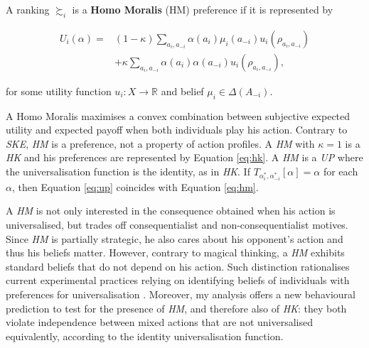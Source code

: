 \begin{definition}
	A ranking \( \succsim_i \) is a \textbf{Homo Moralis} (HM) preference if it is represented by

	\begin{equation}\label{eq:hm}
		\begin{aligned}
			U_i ( \alpha ) = {} & (1-\kappa )\sum_{a_i, a_{-i}} \alpha (a_i) \mu_{i}(a_{-i}) u_i(\rho_{a_i, a_{-i}}) \\[1mm]
			{}                  & + \kappa \sum_{a_i, a_{-i}} \alpha (a_i) \alpha (a_{-i}) u_i(\rho_{a_i, a_{-i}}),
		\end{aligned}
	\end{equation}

	for some utility function \(u_i \colon X \rightarrow \mathbb{R}\) and belief \(\mu_i \in \Delta (A_{-i} )\).
\end{definition}

A Homo Moralis maximises a convex combination between subjective expected utility and expected payoff when both individuals play his action. Contrary to \textit{SKE}, \textit{HM} is a preference, not a property of action profiles. A \textit{HM} with \( \kappa=1 \) is a \textit{HK} and his preferences are represented by Equation \eqref{eq:hk}. A \textit{HM} is a \textit{UP} where the universalisation function is the identity, as in \textit{HK}. If \( T_{\alpha^{*}_i, \alpha^{*}_{-i}} [ \alpha ] = \alpha \) for each \( \alpha\), then Equation \eqref{eq:up} coincides with Equation \eqref{eq:hm}.

A \textit{HM} is not only interested in the consequence obtained when his action is universalised, but trades off consequentialist and non-consequentialist motives. Since \textit{HM} is partially strategic, he also cares about his opponent's action and thus his beliefs matter. However, contrary to magical thinking, a \textit{HM} exhibits standard beliefs that do not depend on his action. Such distinction rationalises current experimental practices relying on identifying beliefs of individuals with preferences for universalisation \citep{vanleeuwenEstimatingSocialPreferences2024}. Moreover, my analysis offers a new behavioural prediction to test for the presence of \textit{HM}, and therefore also of \textit{HK}: they both violate independence between mixed actions that are not universalised equivalently, according to the identity universalisation function.

